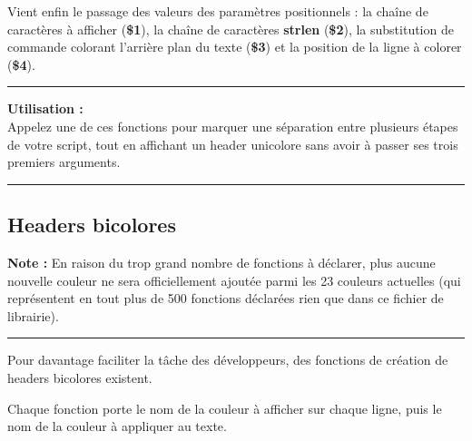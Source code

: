 \documentclass[a4paper,10pt]{article}
\begin{document}
    \begin{justify}
        Vient enfin le passage des valeurs des paramètres positionnels : la chaîne de caractères à afficher (\textbf{\color{vars}\$1}), la chaîne de caractères \textbf{strlen} (\textbf{\color{vars}\$2}), la substitution de commande colorant l'arrière plan du texte (\textbf{\color{vars}\$3}) et la position de la ligne à colorer (\textbf{\color{vars}\$4}).
    \end{justify}

    \par\noindent\rule{\textwidth}{0.4pt}

    \begin{justify}
        \textbf{Utilisation :}\\[1\baselineskip]
        Appelez une de ces fonctions pour marquer une séparation entre plusieurs étapes de votre script, tout en affichant un header unicolore sans avoir à passer ses trois premiers arguments.
    \end{justify}




    \color{sec2}\par\noindent\rule{\textwidth}{0.4pt}\color{text}

    \color{sec2}
    \subsection{Headers bicolores}\color{text}

    \begin{justify}
        \textbf{Note :} En raison du trop grand nombre de fonctions à déclarer, plus aucune nouvelle couleur ne sera officiellement ajoutée parmi les 23 couleurs actuelles (qui représentent en tout plus de 500 fonctions déclarées rien que dans ce fichier de librairie).
    \end{justify}

    \par\noindent\rule{\textwidth}{0.4pt}

    \begin{justify}
        Pour davantage faciliter la tâche des développeurs, des fonctions de création de headers bicolores existent.
    \end{justify}

    \begin{justify}
        Chaque fonction porte le nom de la couleur à afficher sur chaque ligne, puis le nom de la couleur à appliquer au texte.
    \end{justify}
\end{document}
